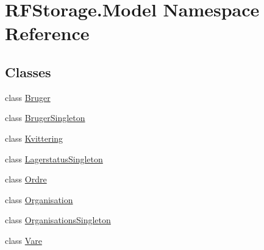 \hypertarget{namespace_r_f_storage_1_1_model}{}\section{R\+F\+Storage.\+Model Namespace Reference}
\label{namespace_r_f_storage_1_1_model}
\subsection*{Classes}
\begin{DoxyCompactItemize}
\item 
class \mbox{\hyperlink{class_r_f_storage_1_1_model_1_1_bruger}{Bruger}}
\item 
class \mbox{\hyperlink{class_r_f_storage_1_1_model_1_1_bruger_singleton}{Bruger\+Singleton}}
\item 
class \mbox{\hyperlink{class_r_f_storage_1_1_model_1_1_kvittering}{Kvittering}}
\item 
class \mbox{\hyperlink{class_r_f_storage_1_1_model_1_1_lagerstatus_singleton}{Lagerstatus\+Singleton}}
\item 
class \mbox{\hyperlink{class_r_f_storage_1_1_model_1_1_ordre}{Ordre}}
\item 
class \mbox{\hyperlink{class_r_f_storage_1_1_model_1_1_organisation}{Organisation}}
\item 
class \mbox{\hyperlink{class_r_f_storage_1_1_model_1_1_organisations_singleton}{Organisations\+Singleton}}
\item 
class \mbox{\hyperlink{class_r_f_storage_1_1_model_1_1_vare}{Vare}}
\end{DoxyCompactItemize}
